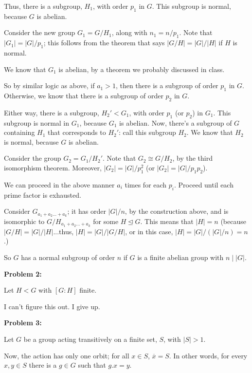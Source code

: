 \documentclass[a4paper,12pt]{article}
\newcommand{\tab}{\hspace{4mm}} %
\newcommand{\shunt}{\vspace{20mm}}
\newcommand{\absval}[1]{\lvert #1 \rvert}
\newcommand{\subgp}{\mathrel{\unlhd}}
\begin{document}
\tab Thus, there is a subgroup, $H_1$, with order $p_1$ in $G$. This subgroup is normal, because $G$ is abelian. 

\tab Consider the new group $G_1=G/H_1$, along with $n_1 = n/p_1$. Note that $\absval{G_1} = \absval{G}/p_1$; this follows from the theorem that says $\absval{G/H} = \absval{G}/\absval{H}$ if $H$ is normal.

\tab We know that $G_1$ is abelian, by a theorem we probably discussed in class.

\tab So by similar logic as above, if $a_1 > 1$, then there is a subgroup of order $p_1$ in $G$. Otherwise, we know that there is a subgroup of order $p_2$ in $G$.

\tab Either way, there is a subgroup, $H_2' < G_1$, with order $p_1$ (or $p_2$) in $G_1$. This subgroup is normal in $G_1$, because $G_1$ is abelian. Now, there's a subgroup of $G$ containing $H_1$ that corresponds to $H_2'$: call this subgroup $H_2$. We know that $H_2$ is normal, because $G$ is abelian.

\tab Consider the group $G_2=G_1/H_2'$. Note that $G_2 \cong G/H_2$, by the third isomorphism theorem. Moreover, $\absval{G_2} = \absval{G}/p_1^2$ (or $\absval{G_2} = \absval{G}/p_1p_2$).

\tab We can proceed in the above manner $a_i$ times for each $p_i$. Proceed until each prime factor is exhausted.

Consider $G_{a_1+a_2 \ldots +a_k}$; it has order $\absval{G}/n$, by the construction above, and is isomorphic to $G/H_{a_1+a_2 \ldots +a_k}$ for some $H \subgp G$. This means that $\absval{H} = n$ (because $\absval{G/H} = \absval{G}/\absval{H}$...thus, $\absval{H} = \absval{G}/\absval{G/H}$, or in this case, $\absval{H} = \absval{G}/(\absval{G}/n) = n$.)

So $G$ has a normal subgroup of order $n$ if $G$ is a finite abelian group with $n \mid \absval{G}$.

\shunt

{\bf Problem 2:}

Let $H < G$ with $[G:H]$ finite.

I can't figure this out. I give up.

\shunt

{\bf Problem 3:}

Let $G$ be a group acting transitively on a finite set, $S$, with $\absval{S} > 1$.

Now, the action has only one orbit; for all $x \in S$, $\overline{x} = S$. In other words, for every $x, y \in S$ there is a $g \in G$ such that $g.x = y$.
\end{document}
